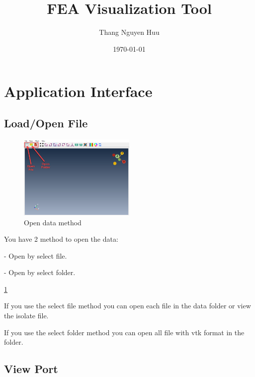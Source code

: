 \documentclass[12pt]{article}
\title{FEA Visualization Tool}
\author{Thang Nguyen Huu}
\date{\today}
\begin{document}
\maketitle{}

\tableofcontents

\clearpage
\newpage

\section{Application Interface}



\subsection{Load/Open File}

\begin{figure} %
    \centering
    \includegraphics[width=0.50\textwidth]{images/openFile.png}
    \caption{Open data method}
    \label{fig1}
\end{figure}

You have 2 method to open the data:

- Open by select file.

- Open by select folder.

\ref{fig1} 

If you use the select file method you can open each file in the data folder or view the isolate file.

If you use the select folder method you can open all file with vtk format in the folder.

\vspace{0.2cm}
\subsection{View Port}
\end{document}
